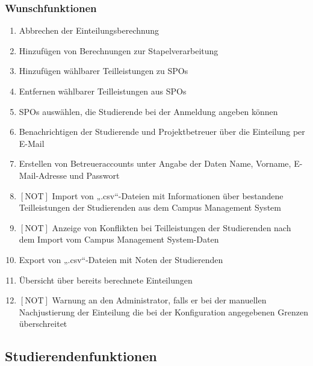 \documentclass[parskip=full]{scrartcl}
\newcommand{\swtLabel}[1]{\textbf{/#1\arabic*0/}}
\begin{document}
\subsubsection{Wunschfunktionen}
\begin{enumerate}[label=\swtLabel{FA}, resume]
  \item Abbrechen der Einteilungsberechnung
  \item Hinzufügen von Berechnungen zur Stapelverarbeitung
  \item Hinzufügen wählbarer Teilleistungen zu SPOs
  \item Entfernen wählbarer Teilleistungen aus SPOs
  \item SPOs auswählen, die Studierende bei der Anmeldung angeben können 
\item 
Benachrichtigen der Studierende und Projektbetreuer über die Einteilung
per E-Mail
\item Erstellen von Betreueraccounts unter Angabe der Daten Name, Vorname,
E-Mail-Adresse und Passwort
\item $[\text{NOT}]$ Import von „.csv“-Dateien mit Informationen über bestandene
Teilleistungen der Studierenden aus dem Campus Management System
\item $[\text{NOT}]$ Anzeige von Konflikten bei Teilleistungen der Studierenden
nach dem Import vom Campus Management System-Daten
\item Export von „.csv“-Dateien mit Noten der Studierenden
\item Übersicht über bereits berechnete Einteilungen
\item $[\text{NOT}]$ Warnung an den Administrator, falls er bei der manuellen
Nachjustierung der Einteilung die bei der Konfiguration angegebenen Grenzen überschreitet
\end{enumerate}


\subsection{Studierendenfunktionen}
\end{document}
